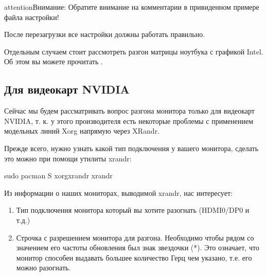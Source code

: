 \documentclass[letterpaper,10pt,russian,openany]{sphinxmanual}
\begin{document}
\begin{sphinxadmonition}{attention}{Внимание:}
\sphinxAtStartPar
Обратите внимание на комментарии в привиденном примере файла настройки!
\end{sphinxadmonition}

\sphinxAtStartPar
После перезагрузки все настройки должны работать правильно.

\sphinxAtStartPar
Отдельным случаем стоит рассмотреть разгон матрицы ноутбука с графикой Intel.
Об этом вы можете прочитать .

\ignorespaces 

\subsection{Для видеокарт NVIDIA}
\label{\detokenize{source/first-steps:monitor-overlocking-nvidia}}\label{\detokenize{source/first-steps:index-18}}\label{\detokenize{source/first-steps:id17}}
\sphinxAtStartPar
Сейчас мы будем рассматривать вопрос разгона монитора только для видеокарт NVIDIA,
т. к. у этого производителя есть некоторые проблемы с применением модельных линий Xorg напрямую через XRandr.

\sphinxAtStartPar
Прежде всего, нужно узнать какой тип подключения у вашего монитора, сделать это можно при помощи утилиты xrandr:

\begin{sphinxVerbatim}[commandchars=\\\{\}]
sudo pacman \PYGZhy{}S xorg\PYGZhy{}xrandr 
xrandr                     
\end{sphinxVerbatim}

\sphinxAtStartPar
Из информации о наших мониторах, выводимой xrandr, нас интересует:
\begin{enumerate}
%
\item {} 
\sphinxAtStartPar
Тип подключения монитора который вы хотите разогнать (HDMI\sphinxhyphen{}0/DP\sphinxhyphen{}0 и т.д.)

\item {} 
\sphinxAtStartPar
Строчка с разрешением монитора для разгона.
Необходимо чтобы рядом со значением его частоты обновления был знак звездочки (*).
Это означает, что монитор способен выдавать большее количество Герц чем указано, т.е. его можно разогнать.

\end{enumerate}
\end{document}
